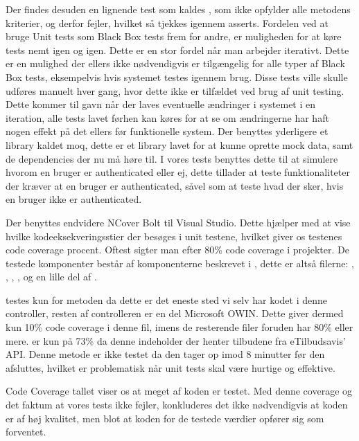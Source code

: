 Der findes desuden en lignende test som kaldes , som ikke opfylder alle metodens kriterier, og derfor fejler, hvilket så tjekkes igennem asserts.
Fordelen ved at bruge Unit tests som Black Box tests frem for andre, er muligheden for at køre tests nemt igen og igen.
Dette er en stor fordel når man arbejder iterativt.
Dette er en mulighed der ellers ikke nødvendigvis er tilgængelig for alle typer af Black Box tests, eksempelvis hvis systemet testes igennem brug.
Disse tests ville skulle udføres manuelt hver gang, hvor dette ikke er tilfældet ved brug af unit testing.
Dette kommer til gavn når der laves eventuelle ændringer i systemet i en iteration, alle tests lavet førhen kan køres for at se om ændringerne har haft nogen effekt på det ellers før funktionelle system. 
Der benyttes yderligere et library kaldet moq, dette er et library lavet for at kunne oprette mock data, samt de dependencies der nu må høre til.
I vores tests benyttes dette til at simulere hvorom en bruger er authenticated eller ej, dette tillader at teste funktionaliteter der kræver at en bruger er authenticated, såvel som at teste hvad der sker, hvis en bruger ikke er authenticated.

Der benyttes endvidere NCover Bolt til Visual Studio. 
Dette hjælper med at vise hvilke kodeeksekveringsstier der besøges i unit testene, hvilket giver os testenes code coverage procent.
Oftest sigter man efter 80\% code coverage i projekter. \citep{Code_Coverage}
De testede komponenter består af komponenterne beskrevet i , dette er altså filerne: , , , ,  og en lille del af .

 testes kun for metoden  da dette er det eneste sted vi selv har kodet i denne controller, resten af controlleren er en del Microsoft OWIN.
Dette giver dermed kun 10\% code coverage i denne fil, imens de resterende filer foruden   har 80\% eller mere.
 er kun på 73\% da denne indeholder  der henter tilbudene fra eTilbudsavis' API. 
Denne metode er ikke testet da den tager op imod 8 minutter før den afsluttes, hvilket er problematisk når unit tests skal være hurtige og effektive.

Code Coverage tallet viser os at meget af koden er testet.
Med denne coverage og det faktum at vores tests ikke fejler, konkluderes det ikke nødvendigvis at koden er af høj kvalitet, men blot at koden for de testede værdier opfører sig som forventet.
